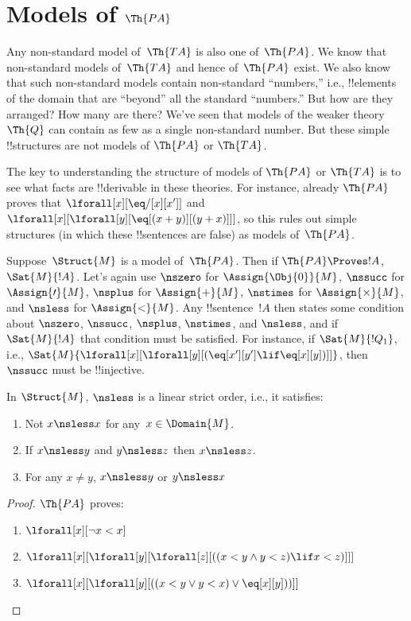 \documentclass[../../../include/open-logic-section]{subfiles}
\begin{document}
\section{Models of $\Th{PA}$}

\begin{explain}
Any non-standard model of~$\Th{TA}$ is also one of~$\Th{PA}$. We know
that non-standard models of~$\Th{TA}$ and hence of~$\Th{PA}$ exist. We
also know that such non-standard models contain non-standard
``numbers,'' i.e., !!{element}s of the domain that are ``beyond'' all
the standard ``numbers.''  But how are they arranged? How many are
there? We've seen that models of the weaker theory~$\Th{Q}$ can
contain as few as a single non-standard number. But these simple
!!{structure}s are not models of $\Th{PA}$ or $\Th{TA}$.

The key to understanding the structure of models of $\Th{PA}$ or
$\Th{TA}$ is to see what facts are !!{derivable} in these theories.
For instance, already $\Th{PA}$ proves that $\lforall[x][\eq/[x][x']]$
and $\lforall[x][\lforall[y][\eq[(x+y)][(y+x)]]]$, so this rules out
simple structures (in which these !!{sentence}s are false) as models
of~$\Th{PA}$.

Suppose~$\Struct{M}$ is a model of~$\Th{PA}$. Then if $\Th{PA} \Proves
!A$, $\Sat{M}{!A}$.  Let's again use $\nszero$ for
$\Assign{\Obj{0}}{M}$, $\nssucc$ for $\Assign{\prime}{M}$, $\nsplus$
for $\Assign{+}{M}$, $\nstimes$ for $\Assign{\times}{M}$, and
$\nsless$ for $\Assign{<}{M}$. Any !!{sentence}~$!A$ then states some
condition about $\nszero$, $\nssucc$, $\nsplus$, $\nstimes$, and
$\nsless$, and if $\Sat{M}{!A}$ that condition must be satisfied. For
instance, if $\Sat{M}{!Q_1}$, i.e.,
$\Sat{M}{\lforall[x][\lforall[y][(\eq[x'][y'] \lif \eq[x][y])]]}$,
then $\nssucc$ must be !!{injective}.
\end{explain}

\begin{prop}
In $\Struct{M}$, $\nsless$ is a linear strict order, i.e., it
satisfies:
\begin{enumerate}
\item Not $x \nsless x$ for any~$x \in \Domain{M}$.
\item If $x \nsless y$ and $y \nsless z$ then $x \nsless z$.
\item For any $x \neq y$, $x \nsless y$ or $y \nsless x$
\end{enumerate}
\end{prop}

\begin{proof}
$\Th{PA}$ proves:
\begin{enumerate}
\item $\lforall[x][\lnot x < x]$
\item $\lforall[x][\lforall[y][\lforall[z][((x < y \land y < z) \lif x < z)]]]$
\item $\lforall[x][\lforall[y][((x < y \lor y < x) \lor \eq[x][y]))]]$
\end{enumerate}
\end{proof}
\end{document}
